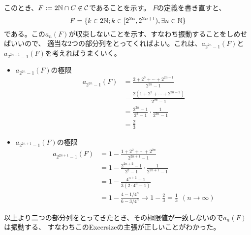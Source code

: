     このとき、$F := 2{\mathbb{N}}\cap C\not\in \mathcal{C}$であることを示す。
    $F$の定義を書き直すと、
    \[
        F = \{k\in2{\mathbb{N}};k\in[2^{2n}, 2^{2n+1}),\exists n\in{\mathbb{N}}\}
    \]
    である。この$a_n(F)$が収束しないことを示す、すなわち振動することをしめせばいいので、
    適当な$2$つの部分列をとってくればよい。これは、$a_{2^{2n}-1}(F)$と$a_{2^{2n + 1}-1}(F)$を考えればうまくいく。
    \begin{itemize}
        \item $a_{2^{2n} - 1}(F)$の極限
            \begin{align*}
                a_{2^{2n} - 1}(F) &= \frac{2 + 2^3 + \cdots + 2^{2n - 1}}{2^{2n} - 1} \\
                &= \frac{2(1 + 2^2 + \cdots + 2^{2n-2})}{2^{2n} - 1} \\
                &= \frac{2^{2n} - 1}{2^2-1} \cdot \frac{1}{2^{2n} - 1} \\
                &= \frac{2}{3}
            \end{align*}
        \item $a_{2^{2n + 1} - 1}(F)$の極限
            \begin{align*}
                a_{2^{2n + 1} - 1}(F) &= 1 - \frac{1 + 2^2 + \cdots + 2^{2n}}{2^{2n + 1} - 1} \\
                &= 1 - \frac{2^{2n + 2} - 1}{2^2-1} \cdot \frac{1}{2^{2n + 1} - 1} \\
                &= 1 - \frac{4^{n + 1} - 1}{3(2 \cdot 4^n - 1)} \\
                &= 1 - \frac{4 - 1/4^n}{6 - 3/4^n} \to 1 - \frac{2}{3} = \frac{1}{3}\ \ (n\to\infty)
            \end{align*}
    \end{itemize}
    以上より二つの部分列をとってきたとき、その極限値が一致しないので$a_n(F)$は振動する、
    すなわちこのExcersizeの主張が正しいことがわかった。
